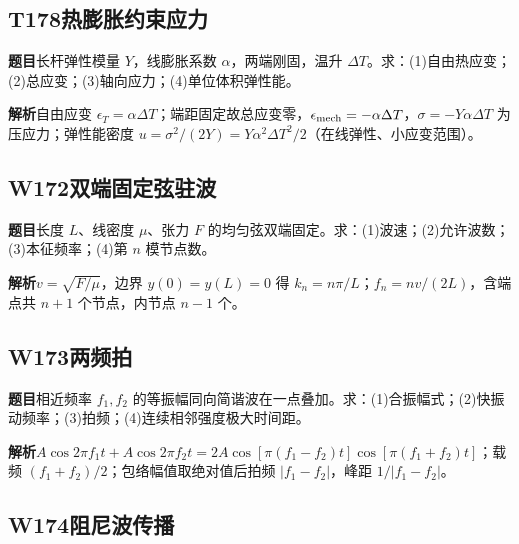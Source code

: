 \par\medskip

\subsection*{T178\quad 热膨胀约束应力}

\textbf{题目}\quad 长杆弹性模量 $Y$，线膨胀系数 $\alpha$，两端刚固，温升 $\Delta T$。求：(1)自由热应变；(2)总应变；(3)轴向应力；(4)单位体积弹性能。

\par\textbf{解析}\quad 自由应变 $\epsilon_T=\alpha\Delta T$；端距固定故总应变零，$\epsilon_{\rm mech}=-\alpha\Delta T$，$\sigma=-Y\alpha\Delta T$ 为压应力；弹性能密度 $u=\sigma^2/(2Y)=Y\alpha^2\Delta T^2/2$（在线弹性、小应变范围）。

\par\medskip

\subsection*{W172\quad 双端固定弦驻波}

\textbf{题目}\quad 长度 $L$、线密度 $\mu$、张力 $F$ 的均匀弦双端固定。求：(1)波速；(2)允许波数；(3)本征频率；(4)第 $n$ 模节点数。

\par\textbf{解析}\quad $v=\sqrt{F/\mu}$，边界 $y(0)=y(L)=0$ 得 $k_n=n\pi/L$；$f_n=nv/(2L)$，含端点共 $n+1$ 个节点，内节点 $n-1$ 个。

\par\medskip

\subsection*{W173\quad 两频拍}

\textbf{题目}\quad 相近频率 $f_1,f_2$ 的等振幅同向简谐波在一点叠加。求：(1)合振幅式；(2)快振动频率；(3)拍频；(4)连续相邻强度极大时间距。

\par\textbf{解析}\quad $A\cos2\pi f_1t+A\cos2\pi f_2t=2A\cos[\pi(f_1-f_2)t]\cos[\pi(f_1+f_2)t]$；载频 $(f_1+f_2)/2$；包络幅值取绝对值后拍频 $|f_1-f_2|$，峰距 $1/|f_1-f_2|$。

\par\medskip

\subsection*{W174\quad 阻尼波传播}


